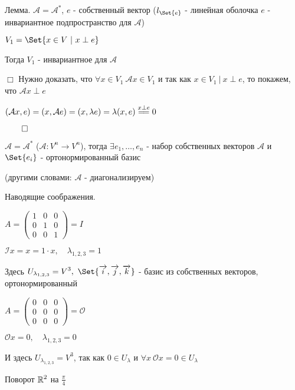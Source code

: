 \documentclass[12pt]{article}
\begin{document}
    \Th Лемма. $\displaystyle \mathcal{A} = \mathcal{A}^*$, $e$ - собственный вектор ($\displaystyle l_{\Set{e}}$ - линейная оболочка $e$ - инвариантное подпространство для $\mathcal{A}$)

    $\displaystyle V_1 = \Set{x \in V \ | \ x \perp e}$

    Тогда $\displaystyle V_1$ - инвариантное для $\mathcal{A}$

    $\Box$ Нужно доказать, что $\displaystyle \forall x \in V_1 \ \mathcal{A}x \in V_1$ и так как $\displaystyle x \in V_1 \ | \ x \perp e$, то
    покажем, что $\mathcal{A}x \perp e$

    $(\mathcal{A}x, e) = (x, \mathcal{A}e) = (x, \lambda e) = \lambda (x, e) \stackrel{x \perp e}{=\joinrel=} 0$

    $\qed$

    \Th $\displaystyle \mathcal{A} = \mathcal{A}^*$ ($\displaystyle \mathcal{A} : V^n \to V^n$),
    тогда $\displaystyle \exists e_1, \dots, e_n$ - набор собственных векторов $\mathcal{A}$ и $\displaystyle \Set{e_i}$ - ортонормированный базис

    (другими словами: $\mathcal{A}$ - диагонализируем)

    Наводящие соображения.

     $A = \begin{pmatrix}1 & 0 & 0 \\ 0 & 1 & 0 \\ 0 & 0 & 1\end{pmatrix} = I$

    $\displaystyle \mathcal{I}x = x = 1 \cdot x, \quad \lambda_{1,2,3} = 1$

    Здесь $\displaystyle U_{\lambda_{1,2,3}} = V^3, \ \Set{\overrightarrow{i}, \overrightarrow{j}, \overrightarrow{k}}$ - базис из собственных векторов, ортонормированный

     $A = \begin{pmatrix}0 & 0 & 0 \\ 0 & 0 & 0 \\ 0 & 0 & 0\end{pmatrix} = \mathcal{O}$

    $\displaystyle \mathcal{O}x = 0, \quad \lambda_{1,2,3} = 0$

    И здесь $\displaystyle U_{\lambda_{1,2,3}} = V^3$, так как $\displaystyle 0 \in U_\lambda$ и $\displaystyle \forall x \ \mathcal{O}x = 0 \in U_\lambda$

     Поворот $\displaystyle \mathbb{R}^2$ на $\displaystyle \frac{\pi}{4}$
\end{document}
